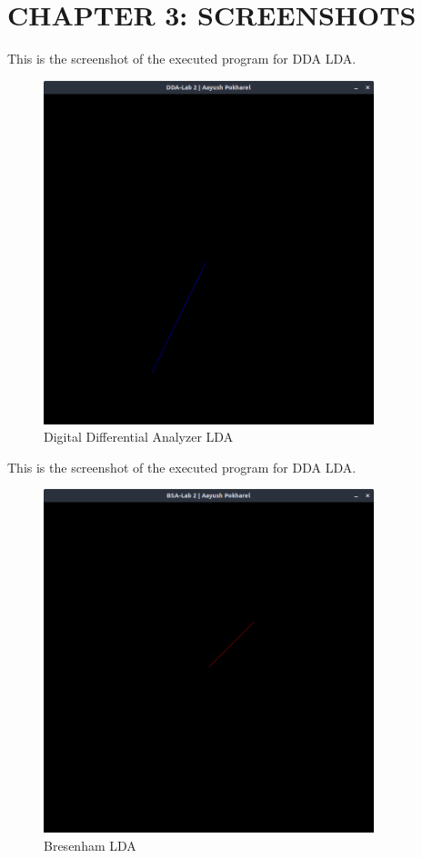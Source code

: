 \documentclass[12pt]{article}
\begin{document}
\clearpage
\section{CHAPTER 3: SCREENSHOTS}
This is the screenshot of the executed program for DDA LDA.
\begin{figure}[h]
    \centerline{\includegraphics[height=100mm]{DDA.png}}
    \caption{Digital Differential Analyzer LDA}
    \label{fig}
\end{figure}
\clearpage
This is the screenshot of the executed program for DDA LDA.
\begin{figure}[h]
    \centerline{\includegraphics[height=100mm]{BSA.png}}
    \caption{Bresenham LDA}
    \label{fig}
\end{figure}
\end{document}
